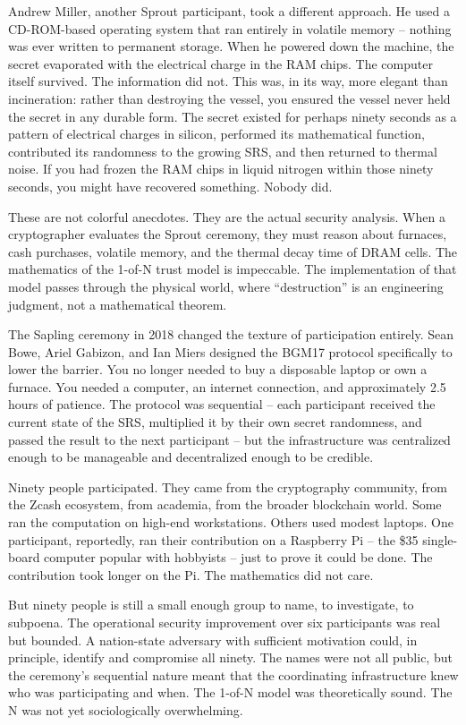 \documentclass[
  11pt,
  openany]{report}
\begin{document}
Andrew Miller, another Sprout participant, took a different approach. He used a
CD-ROM-based operating system that ran entirely in volatile memory -- nothing
was ever written to permanent storage. When he powered down the machine, the
secret evaporated with the electrical charge in the RAM chips. The computer
itself survived. The information did not. This was, in its way, more elegant
than incineration: rather than destroying the vessel, you ensured the vessel
never held the secret in any durable form. The secret existed for perhaps ninety
seconds as a pattern of electrical charges in silicon, performed its
mathematical function, contributed its randomness to the growing SRS, and then
returned to thermal noise. If you had frozen the RAM chips in liquid nitrogen
within those ninety seconds, you might have recovered something. Nobody did.

These are not colorful anecdotes. They are the actual security analysis. When a
cryptographer evaluates the Sprout ceremony, they must reason about furnaces,
cash purchases, volatile memory, and the thermal decay time of DRAM cells. The
mathematics of the 1-of-N trust model is impeccable. The implementation of that
model passes through the physical world, where ``destruction'' is an engineering
judgment, not a mathematical theorem.

The Sapling ceremony in 2018 changed the texture of participation entirely. Sean
Bowe, Ariel Gabizon, and Ian Miers designed the BGM17 protocol specifically to
lower the barrier. You no longer needed to buy a disposable laptop or own a
furnace. You needed a computer, an internet connection, and approximately 2.5
hours of patience. The protocol was sequential -- each participant received the
current state of the SRS, multiplied it by their own secret randomness, and
passed the result to the next participant -- but the infrastructure was
centralized enough to be manageable and decentralized enough to be credible.

Ninety people participated. They came from the cryptography community, from the
Zcash ecosystem, from academia, from the broader blockchain world. Some ran the
computation on high-end workstations. Others used modest laptops. One
participant, reportedly, ran their contribution on a Raspberry Pi -- the \$35
single-board computer popular with hobbyists -- just to prove it could be done.
The contribution took longer on the Pi. The mathematics did not care.

But ninety people is still a small enough group to name, to investigate, to
subpoena. The operational security improvement over six participants was real
but bounded. A nation-state adversary with sufficient motivation could, in
principle, identify and compromise all ninety. The names were not all public,
but the ceremony's sequential nature meant that the coordinating infrastructure
knew who was participating and when. The 1-of-N model was theoretically sound.
The N was not yet sociologically overwhelming.
\end{document}

